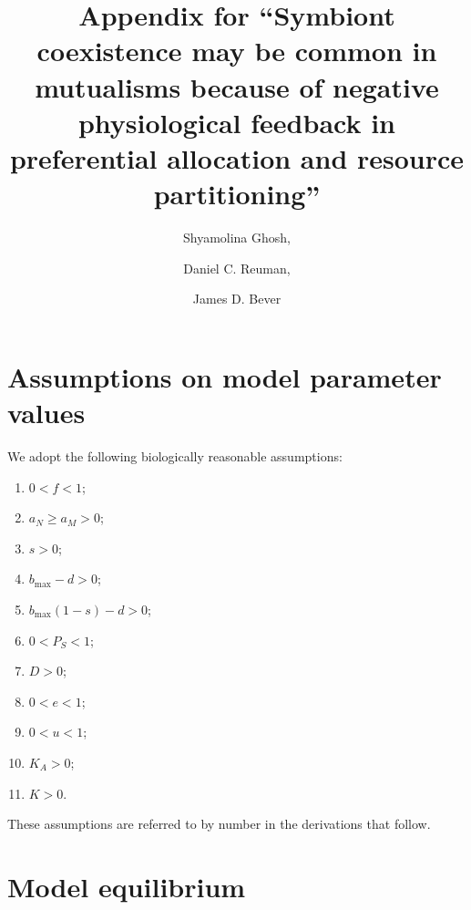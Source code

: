 \documentclass[letterpaper,11pt]{article}
\title{Appendix for ``Symbiont coexistence may be common in mutualisms because of negative physiological feedback in preferential allocation and resource partitioning''}
\author{Shyamolina Ghosh, \and Daniel C. Reuman, \and James D. Bever}
\date{}
\newcommand{\bmax}{b_{\text{max}}}
\begin{document}
\maketitle

\section{Assumptions on model parameter values}\label{sect:assumptions}

\noindent We adopt the following biologically reasonable assumptions:
\begin{enumerate}
\item $0<f<1$;
\item $a_N \geq a_M > 0$;
\item $s>0$;
\item $\bmax-d>0$;
\item $\bmax(1-s)-d>0$;
\item $0<P_S<1$;
\item $D>0$;
\item $0<e<1$;
\item $0<u<1$;
\item $K_A>0$;
\item $K>0$.
\end{enumerate}
These assumptions are referred to by number in the derivations that follow.

\section{Model equilibrium}\label{sect:equil}
\end{document}
